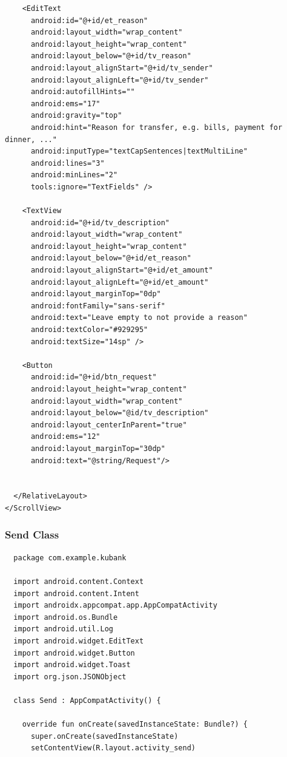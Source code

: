 \documentclass[11pt, a4paper]{article}
\begin{document}
\begin{appendices}
\begin{lstlisting}
    <EditText
      android:id="@+id/et_reason"
      android:layout_width="wrap_content"
      android:layout_height="wrap_content"
      android:layout_below="@+id/tv_reason"
      android:layout_alignStart="@+id/tv_sender"
      android:layout_alignLeft="@+id/tv_sender"
      android:autofillHints=""
      android:ems="17"
      android:gravity="top"
      android:hint="Reason for transfer, e.g. bills, payment for dinner, ..."
      android:inputType="textCapSentences|textMultiLine"
      android:lines="3"
      android:minLines="2"
      tools:ignore="TextFields" />

    <TextView
      android:id="@+id/tv_description"
      android:layout_width="wrap_content"
      android:layout_height="wrap_content"
      android:layout_below="@+id/et_reason"
      android:layout_alignStart="@+id/et_amount"
      android:layout_alignLeft="@+id/et_amount"
      android:layout_marginTop="0dp"
      android:fontFamily="sans-serif"
      android:text="Leave empty to not provide a reason"
      android:textColor="#929295"
      android:textSize="14sp" />

    <Button
      android:id="@+id/btn_request"
      android:layout_height="wrap_content"
      android:layout_width="wrap_content"
      android:layout_below="@id/tv_description"
      android:layout_centerInParent="true"
      android:ems="12"
      android:layout_marginTop="30dp"
      android:text="@string/Request"/>


  </RelativeLayout>
</ScrollView>
\end{lstlisting}
\subsubsection{Send Class}
\begin{lstlisting}
  package com.example.kubank

  import android.content.Context
  import android.content.Intent
  import androidx.appcompat.app.AppCompatActivity
  import android.os.Bundle
  import android.util.Log
  import android.widget.EditText
  import android.widget.Button
  import android.widget.Toast
  import org.json.JSONObject

  class Send : AppCompatActivity() {

    override fun onCreate(savedInstanceState: Bundle?) {
      super.onCreate(savedInstanceState)
      setContentView(R.layout.activity_send)


\end{lstlisting}
\end{appendices}
\end{document}
